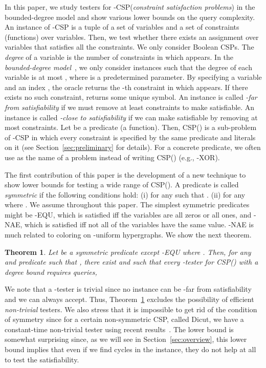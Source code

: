 \documentclass[letterpaper,11pt]{article}
\newtheorem{theorem}{Theorem}[section]
\newcommand{\kcsp}{\textsf{-CSP}\xspace}
\newcommand{\csp}[1]{\textsf{CSP}(#1)\xspace}
\newcommand{\kxor}{-\textsf{XOR}\xspace}
\newcommand{\kequ}{-\textsf{EQU}\xspace}
\newcommand{\knae}{-\textsf{NAE}\xspace}
\begin{document}
In this paper, we study testers for \kcsp (\textit{constraint satisfaction problems}) in the bounded-degree model and show various lower bounds on the query complexity.
An instance  of \kcsp is a tuple of a set of variables and a set of constraints (functions) over  variables.
Then, we test whether there exists an assignment over variables that satisfies all the constraints.
We only consider Boolean CSPs.
The \textit{degree} of a variable  is the number of constraints in which  appears.
In the \textit{bounded-degree model}~\cite{GR08},
we only consider instances such that the degree of each variable is at most , where  is a predetermined parameter.
By specifying a variable  and an index , the oracle  returns the -th constraint in which  appears.
If there exists no such constraint,  returns some unique symbol.
An instance  is called \textit{-far from satisfiability} if we must remove at least  constraints to make  satisfiable.
An instance  is called \textit{-close to satisfiability} if we can make  satisfiable by removing at most  constraints.
Let  be a predicate (a function).
Then, \csp{} is a sub-problem of \kcsp in which every constraint is specified by the same predicate  and literals on it (see Section~\ref{sec:preliminary} for details).
For a concrete predicate, we often use  as the name of a problem instead of writing \csp{} (e.g., \kxor).

The first contribution of this paper is the development of a new technique to show lower bounds for testing a wide range of \csp{}.
A predicate  is called \textit{symmetric} if the following conditions hold: 
(i)  for any  such that .
(ii)  for any  where .
We assume  throughout this paper.
The simplest symmetric predicates might be \kequ, 
which is satisfied iff the variables are all zeros or all ones,
and \knae,
which is satisfied iff not all of the variables have the same value.
\knae is much related to coloring on -uniform hypergraphs.
We show the next theorem.
\begin{theorem}\label{thr:two-sided}
  Let  be a symmetric predicate except \kequ where .
  Then, for any  and predicate  such that ,
  there exist  and  such that 
  every -tester for \csp{} with a degree bound  requires  queries,
\end{theorem}
We note that a -tester is trivial since no instance can be -far from satisfiability and we can always accept.
Thus, Theorem~\ref{thr:two-sided} excludes the possibility of efficient \textit{non-trivial} testers.
We also stress that it is impossible to get rid of the condition of symmetry since for a certain non-symmetric CSP, 
called \textsf{Dicut}, we have a constant-time non-trivial tester using recent results~\cite{Tre98,Yos10}.
The lower bound  is somewhat surprising since, 
as we will see in Section~\ref{sec:overview}, 
this lower bound implies that even if we find cycles in the instance,
they do not help at all to test the satisfiability.
\end{document}
